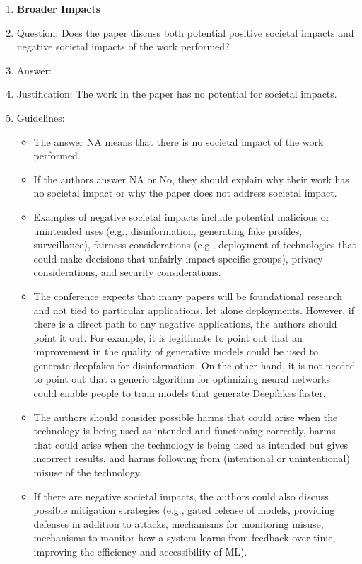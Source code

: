 \documentclass[letterpaper]{article}
\begin{document}
\begin{enumerate}
\item {\bf Broader Impacts}
    \item[] Question: Does the paper discuss both potential positive societal impacts and negative societal impacts of the work performed?
    \item[] Answer: \answerNA{} %
    \item[] Justification: The work in the paper has no potential for societal impacts.
    \item[] Guidelines:
    \begin{itemize}
        \item The answer NA means that there is no societal impact of the work performed.
        \item If the authors answer NA or No, they should explain why their work has no societal impact or why the paper does not address societal impact.
        \item Examples of negative societal impacts include potential malicious or unintended uses (e.g., disinformation, generating fake profiles, surveillance), fairness considerations (e.g., deployment of technologies that could make decisions that unfairly impact specific groups), privacy considerations, and security considerations.
        \item The conference expects that many papers will be foundational research and not tied to particular applications, let alone deployments. However, if there is a direct path to any negative applications, the authors should point it out. For example, it is legitimate to point out that an improvement in the quality of generative models could be used to generate deepfakes for disinformation. On the other hand, it is not needed to point out that a generic algorithm for optimizing neural networks could enable people to train models that generate Deepfakes faster.
        \item The authors should consider possible harms that could arise when the technology is being used as intended and functioning correctly, harms that could arise when the technology is being used as intended but gives incorrect results, and harms following from (intentional or unintentional) misuse of the technology.
        \item If there are negative societal impacts, the authors could also discuss possible mitigation strategies (e.g., gated release of models, providing defenses in addition to attacks, mechanisms for monitoring misuse, mechanisms to monitor how a system learns from feedback over time, improving the efficiency and accessibility of ML).
    \end{itemize}
    

\end{enumerate}
\end{document}
